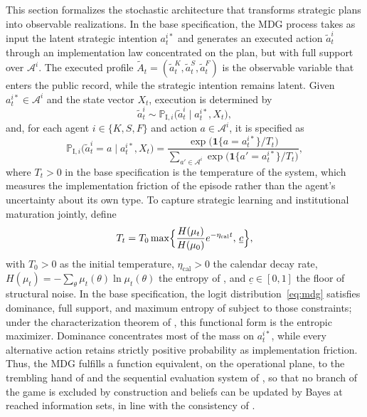 \documentclass[review,authoryear,12pt]{elsarticle}
\theoremstyle{plain}
\theoremstyle{definition}
\newcommand{\1}{\mathbf{1}}
\newcommand{\ProbI}[1]{\mathbb{P}_{\mathrm{I},#1}}
\begin{document}
This section formalizes the stochastic architecture that transforms strategic plans into observable realizations. In the base specification, the MDG process takes as input the latent strategic intention $a_t^{i\ast}$ and generates an executed action $\tilde{a}_t^i$ through an implementation law concentrated on the plan, but with full support over $\mathcal{A}^i$. The executed profile $\tilde{A}_t=(\tilde{a}_t^K,\tilde{a}_t^S,\tilde{a}_t^F)$ is the observable variable that enters the public record, while the strategic intention remains latent. Given $a_t^{i\ast}\in\mathcal{A}^i$ and the state vector $X_t$, execution is determined by
\[
\tilde{a}_t^i\sim\ProbI{i}\bigl(\tilde{a}_t^i\mid a_t^{i\ast},X_t\bigr),
\]
and, for each agent $i\in\{K,S,F\}$ and action $a\in\mathcal{A}^i$, it is specified as
\begin{equation}
\ProbI{i}\bigl(\tilde{a}_t^i=a\mid a_t^{i\ast},X_t\bigr)
=\frac{\exp\bigl(\mathbf{1}\{a=a_t^{i\ast}\}/T_t\bigr)}{\sum_{a'\in\mathcal{A}^i}\exp\bigl(\mathbf{1}\{a'=a_t^{i\ast}\}/T_t\bigr)},
\label{eq:mdg}
\end{equation}
where $T_t>0$ in the base specification is the temperature of the system, which measures the implementation friction of the episode rather than the agent's uncertainty about its own type. To capture strategic learning and institutional maturation jointly, define
\begin{equation}
T_t=T_0\max\Bigl\{\frac{H(\mu_t)}{H(\mu_0)}e^{-\eta_{\mathrm{cal}}t},\,\underline{c}\Bigr\},
\label{eq:temperature}
\end{equation}
with $T_0>0$ as the initial temperature, $\eta_{\mathrm{cal}}>0$ the calendar decay rate, $H(\mu_t)=-\sum_\theta\mu_t(\theta)\ln\mu_t(\theta)$ the entropy of \citet{Shannon1948}, and $\underline{c}\in[0,1]$ the floor of structural noise. In the base specification, the logit distribution~\eqref{eq:mdg} satisfies dominance, full support, and maximum entropy of \citet{Shannon1948} subject to those constraints; under the characterization theorem of \citet{Jaynes1957Information}, this functional form is the entropic maximizer. Dominance concentrates most of the mass on $a_t^{i\ast}$, while every alternative action retains strictly positive probability as implementation friction. Thus, the MDG fulfills a function equivalent, on the operational plane, to the trembling hand of \citet{Selten1975Perfectness} and the sequential evaluation system of \citet{KrepsWilson1982}, so that no branch of the game is excluded by construction and beliefs can be updated by Bayes at reached information sets, in line with the consistency of \citet{FudenbergTirole1991PBE}.
\end{document}
